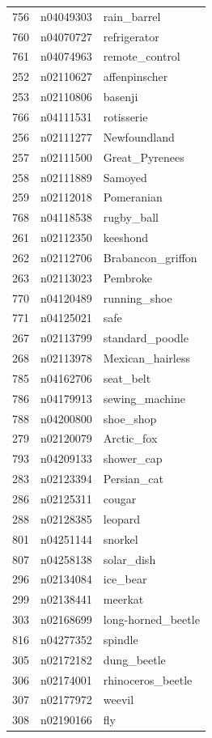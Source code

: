\begin{table}
\begin{tabular}{cll}
756 & n04049303 & rain_barrel \\
760 & n04070727 & refrigerator \\
761 & n04074963 & remote_control \\
252 & n02110627 & affenpinscher \\
253 & n02110806 & basenji \\
766 & n04111531 & rotisserie \\
256 & n02111277 & Newfoundland \\
257 & n02111500 & Great_Pyrenees \\
258 & n02111889 & Samoyed \\
259 & n02112018 & Pomeranian \\
768 & n04118538 & rugby_ball \\
261 & n02112350 & keeshond \\
262 & n02112706 & Brabancon_griffon \\
263 & n02113023 & Pembroke \\
770 & n04120489 & running_shoe \\
771 & n04125021 & safe \\
267 & n02113799 & standard_poodle \\
268 & n02113978 & Mexican_hairless \\
785 & n04162706 & seat_belt \\
786 & n04179913 & sewing_machine \\
788 & n04200800 & shoe_shop \\
279 & n02120079 & Arctic_fox \\
793 & n04209133 & shower_cap \\
283 & n02123394 & Persian_cat \\
286 & n02125311 & cougar \\
288 & n02128385 & leopard \\
801 & n04251144 & snorkel \\
807 & n04258138 & solar_dish \\
296 & n02134084 & ice_bear \\
299 & n02138441 & meerkat \\
303 & n02168699 & long-horned_beetle \\
816 & n04277352 & spindle \\
305 & n02172182 & dung_beetle \\
306 & n02174001 & rhinoceros_beetle \\
307 & n02177972 & weevil \\
308 & n02190166 & fly \\

\end{tabular}
\end{table}
